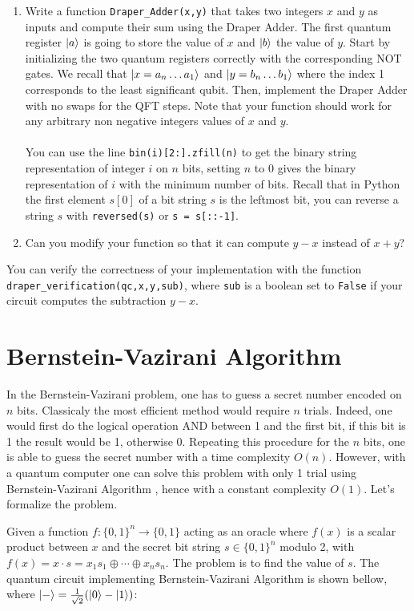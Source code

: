 \documentclass{article}
\begin{document}
\begin{enumerate}
    \item Write a function \verb|Draper_Adder(x,y)| that takes two integers $x$ and $y$ as inputs and compute their sum using the Draper Adder. The first quantum register $\ket{a}$ is going to store the value of $x$ and $\ket{b}$ the value of $y$. Start by initializing the two quantum registers correctly with the corresponding NOT gates. We recall that $\ket{x=a_n\dots a_1}$ and $\ket{y=b_n\dots b_1}$ where the index 1 corresponds to the least significant qubit. Then, implement the Draper Adder with no swaps for the QFT steps. Note that your function should work for any arbitrary non negative integers values of $x$ and $y$. \\\\You can use the line \verb|bin(i)[2:].zfill(n)| to get the binary string representation of integer $i$ on $n$ bits, setting $n$ to 0 gives the binary representation of $i$ with the minimum number of bits. Recall that in Python the first element $s[0]$ of a bit string $s$ is the leftmost bit, you can reverse a string $s$ with \verb|reversed(s)| or \verb|s = s[::-1]|.
    \item Can you modify your function so that it can compute $y-x$ instead of $x+y$?
\end{enumerate}
You can verify the correctness of your implementation with the function \verb|draper_verification(qc,x,y,sub)|, where \verb|sub| is a boolean set to \verb|False| if your circuit computes the subtraction $y-x$.

\section{Bernstein-Vazirani Algorithm}

In the Bernstein-Vazirani problem, one has to guess a secret number encoded on $n$ bits. Classicaly the most efficient method would require $n$ trials. Indeed, one would first do the logical operation AND between 1 and the first bit, if this bit is 1 the result would be 1, otherwise 0. Repeating this procedure for the $n$ bits, one is able to guess the secret number with a time complexity $O(n)$. However, with a quantum computer one can solve this problem with only 1 trial using Bernstein-Vazirani Algorithm \cite{bernstein1993quantum}, hence with a constant complexity $O(1)$. Let's formalize the problem. 

Given a function $f:\{0,1\}^n \rightarrow\{0,1\}$ acting as an oracle where $f(x)$ is a scalar product between $x$ and the secret bit string $s\in \{0,1\}^n$ modulo 2, with $f(x) = x\cdot s=x_1s_1 \oplus \cdots \oplus x_ns_n$. The problem is to find the value of $s$. The quantum circuit implementing Bernstein-Vazirani Algorithm is shown bellow, where $\ket{-}=\frac{1}{\sqrt{2}}(\ket{0}-\ket{1})$:
\end{document}
